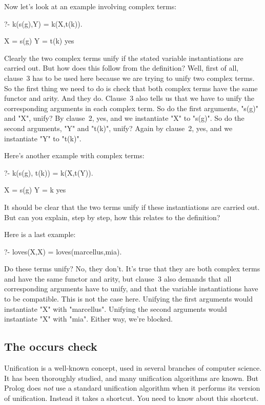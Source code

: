 Now let's look at an example involving complex terms:
\begin{LPNcodedisplay}
?- k(s(g),Y) = k(X,t(k)).

X = s(g)
Y = t(k)
yes
\end{LPNcodedisplay}
%
Clearly the two complex terms unify if the stated variable
instantiations are carried out. But how does this follow from the
definition? Well, first of all, clause~3 has to be used here because
we are trying to unify two complex terms.  So the first thing we need
to do is check that both complex terms have the same functor and
arity. And they do.  Clause~3 also tells us that we have to unify the
corresponding arguments in each complex term. So do the first
arguments, "s(g)" and "X", unify? By clause~2, yes, and we instantiate
"X" to "s(g)". So do the second arguments, "Y" and "t(k)", unify?
Again by clause~2, yes, and we instantiate "Y" to "t(k)".

Here's another example with complex terms:
\begin{LPNcodedisplay}
?- k(s(g), t(k)) = k(X,t(Y)).

X = s(g)
Y = k
yes
\end{LPNcodedisplay}
%
It should be clear that the two terms unify if these instantiations
are carried out. But can you explain, step by step, how this relates
to the definition?

Here is a last example:
\begin{LPNcodedisplay}
?- loves(X,X) = loves(marcellus,mia).
\end{LPNcodedisplay}
%
Do these terms unify? No, they don't. It's true that they are both
complex terms and have the same functor and arity, but clause~3 also
demands that all corresponding arguments have to unify, and that the
variable instantiations have to be compatible. This is not the case
here. Unifying the first arguments would instantiate "X" with
"marcellus". Unifying the second arguments would instantiate "X" with
"mia". Either way, we're blocked.


\subsection*{The occurs check}\label{SUBSEC.L2.OCCURSCHECK}

Unification is a well-known concept, used in several branches of
computer science. It has been thoroughly studied, and many unification
algorithms are known. But Prolog does \textit{not} use a standard
unification algorithm when it performs its version of
unification. Instead it takes a shortcut.  You need to know about this
shortcut.

